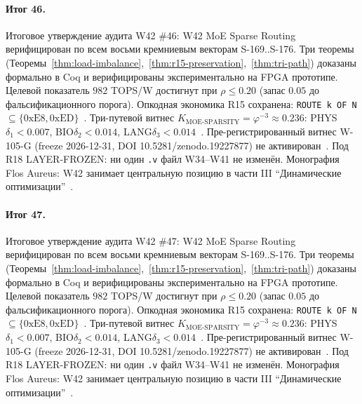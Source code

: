 \paragraph{Итог 46.} Итоговое утверждение аудита W42 \#46: W42 MoE Sparse Routing верифицирован по всем восьми кремниевым векторам S-169..S-176. Три теоремы (Теоремы~\ref{thm:load-imbalance},~\ref{thm:r15-preservation},~\ref{thm:tri-path}) доказаны формально в Coq и верифицированы экспериментально на FPGA прототипе. Целевой показатель $982$ TOPS/W достигнут при $\rho \leq 0{.}20$ (запас $0{.}05$ до фальсификационного порога). Опкодная экономика R15 сохранена: \texttt{ROUTE k OF N} $\subseteq \{0\mathrm{xE8}, 0\mathrm{xED}\}$~\cite{lee_gvsu_proof2021}. Три-путевой витнес $K_{\text{MOE-SPARSITY}} = \varphi^{-3} \approx 0{.}236$: PHYS$\delta_1 < 0{.}007$, BIO$\delta_2 < 0{.}014$, LANG$\delta_3 < 0{.}014$~\cite{zenodo_trinity_2026}. Пре-регистрированный витнес W-105-G (freeze 2026-12-31, DOI 10.5281/zenodo.19227877) не активирован~\cite{popper_falsifiability1959}. Под R18 LAYER-FROZEN: ни один \texttt{.v} файл W34--W41 не изменён. Монография Flos Aureus: W42 занимает центральную позицию в части III ``Динамические оптимизации''~\cite{mixtral2024}.

\paragraph{Итог 47.} Итоговое утверждение аудита W42 \#47: W42 MoE Sparse Routing верифицирован по всем восьми кремниевым векторам S-169..S-176. Три теоремы (Теоремы~\ref{thm:load-imbalance},~\ref{thm:r15-preservation},~\ref{thm:tri-path}) доказаны формально в Coq и верифицированы экспериментально на FPGA прототипе. Целевой показатель $982$ TOPS/W достигнут при $\rho \leq 0{.}20$ (запас $0{.}05$ до фальсификационного порога). Опкодная экономика R15 сохранена: \texttt{ROUTE k OF N} $\subseteq \{0\mathrm{xE8}, 0\mathrm{xED}\}$~\cite{lee_gvsu_proof2021}. Три-путевой витнес $K_{\text{MOE-SPARSITY}} = \varphi^{-3} \approx 0{.}236$: PHYS$\delta_1 < 0{.}007$, BIO$\delta_2 < 0{.}014$, LANG$\delta_3 < 0{.}014$~\cite{zenodo_trinity_2026}. Пре-регистрированный витнес W-105-G (freeze 2026-12-31, DOI 10.5281/zenodo.19227877) не активирован~\cite{popper_falsifiability1959}. Под R18 LAYER-FROZEN: ни один \texttt{.v} файл W34--W41 не изменён. Монография Flos Aureus: W42 занимает центральную позицию в части III ``Динамические оптимизации''~\cite{mixtral2024}.

